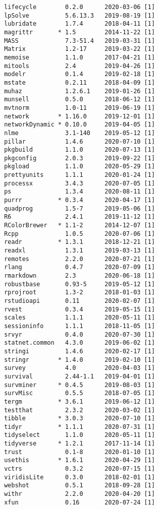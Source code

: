 \documentclass [11pt, proquest] {uwthesis}[2015/03/03]
\begin{document}
\begin{verbatim}
 lifecycle        0.2.0      2020-03-06 [1]
 lpSolve          5.6.13.3   2019-08-19 [1]
 lubridate        1.7.4      2018-04-11 [1]
 magrittr       * 1.5        2014-11-22 [1]
 MASS             7.3-51.4   2019-03-31 [1]
 Matrix           1.2-17     2019-03-22 [1]
 memoise          1.1.0      2017-04-21 [1]
 mitools          2.4        2019-04-26 [1]
 modelr           0.1.4      2019-02-18 [1]
 mstate           0.2.11     2018-04-09 [1]
 muhaz            1.2.6.1    2019-01-26 [1]
 munsell          0.5.0      2018-06-12 [1]
 mvtnorm          1.0-11     2019-06-19 [1]
 network        * 1.16.0     2019-12-01 [1]
 networkDynamic * 0.10.0     2019-04-05 [1]
 nlme             3.1-140    2019-05-12 [1]
 pillar           1.4.6      2020-07-10 [1]
 pkgbuild         1.1.0      2020-07-13 [1]
 pkgconfig        2.0.3      2019-09-22 [1]
 pkgload          1.1.0      2020-05-29 [1]
 prettyunits      1.1.1      2020-01-24 [1]
 processx         3.4.3      2020-07-05 [1]
 ps               1.3.4      2020-08-11 [1]
 purrr          * 0.3.4      2020-04-17 [1]
 quadprog         1.5-7      2019-05-06 [1]
 R6               2.4.1      2019-11-12 [1]
 RColorBrewer   * 1.1-2      2014-12-07 [1]
 Rcpp             1.0.5      2020-07-06 [1]
 readr          * 1.3.1      2018-12-21 [1]
 readxl           1.3.1      2019-03-13 [1]
 remotes          2.2.0      2020-07-21 [1]
 rlang            0.4.7      2020-07-09 [1]
 rmarkdown        2.3        2020-06-18 [1]
 robustbase       0.93-5     2019-05-12 [1]
 rprojroot        1.3-2      2018-01-03 [1]
 rstudioapi       0.11       2020-02-07 [1]
 rvest            0.3.4      2019-05-15 [1]
 scales           1.1.1      2020-05-11 [1]
 sessioninfo      1.1.1      2018-11-05 [1]
 srvyr            0.4.0      2020-07-30 [1]
 statnet.common   4.3.0      2019-06-02 [1]
 stringi          1.4.6      2020-02-17 [1]
 stringr        * 1.4.0      2019-02-10 [1]
 survey           4.0        2020-04-03 [1]
 survival         2.44-1.1   2019-04-01 [1]
 survminer      * 0.4.5      2019-08-03 [1]
 survMisc         0.5.5      2018-07-05 [1]
 tergm          * 3.6.1      2019-06-12 [1]
 testthat         2.3.2      2020-03-02 [1]
 tibble         * 3.0.3      2020-07-10 [1]
 tidyr          * 1.1.1      2020-07-31 [1]
 tidyselect       1.1.0      2020-05-11 [1]
 tidyverse      * 1.2.1      2017-11-14 [1]
 trust            0.1-8      2020-01-10 [1]
 usethis        * 1.6.1      2020-04-29 [1]
 vctrs            0.3.2      2020-07-15 [1]
 viridisLite      0.3.0      2018-02-01 [1]
 webshot          0.5.1      2018-09-28 [1]
 withr            2.2.0      2020-04-20 [1]
 xfun             0.16       2020-07-24 [1]

\end{verbatim}
\end{document}
